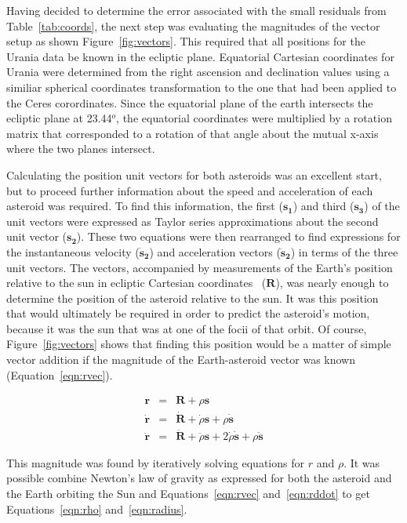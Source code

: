 \documentclass[a4paper,12pt]{article}
\begin{document}
Having decided to determine the error associated with the small residuals from Table~\ref{tab:coords}, the next step was evaluating the magnitudes of the vector setup as shown Figure~\ref{fig:vectors}. This required that all positions for the Urania data be known in the ecliptic plane. Equatorial Cartesian coordinates for Urania were determined from the right ascension and declination values using a similiar spherical coordinates transformation to the one that had been applied to the Ceres corordinates. Since the equatorial plane of the earth intersects the ecliptic plane at 23.44$^o$, the equatorial coordinates were multiplied by a rotation matrix that corresponded to a rotation of that angle about the mutual x-axis where the two planes intersect.

Calculating the position unit vectors for both asteroids was an excellent start, but to proceed further information about the speed and acceleration of each asteroid was required. To find this information, the first ($\mathbf{s_1}$) and third ($\mathbf{s_3}$) of the unit vectors were expressed as Taylor series approximations about the second unit vector ($\mathbf{s_2}$). These two equations were then rearranged to find expressions for the instantaneous velocity ($\mathbf{\dot{s}_2}$) and acceleration vectors ($\mathbf{\ddot{s}_2}$) in terms of the three unit vectors. The vectors, accompanied by measurements of the Earth's position relative to the sun in ecliptic Cartesian coordinates~\citep{urania} ($\mathbf{R}$), was nearly enough to determine the position of the asteroid relative to the sun. It was this position that would ultimately be required in order to predict the asteroid's motion, because it was the sun that was at one of the focii of that orbit. Of course, Figure~\ref{fig:vectors} shows that finding this position would be a matter of simple vector addition if the magnitude of the Earth-asteroid vector was known (Equation~\ref{eqn:rvec}).

\begin{eqnarray}
\label{eqn:rvec}
\mathbf{r} &=& \mathbf{R} + \rho\mathbf{s}\\
\label{eqn:rdot}
\mathbf{\dot{r}} &=& \mathbf{\dot{R}} + \dot{\rho}\mathbf{s} + \rho\mathbf{\dot{s}}\\
\label{eqn:rddot}
\mathbf{\ddot{r}} &=& \mathbf{\ddot{R}} + \ddot{\rho}\mathbf{s} + 2\dot{\rho}\mathbf{\dot{s}} + \rho\mathbf{\ddot{s}}
\end{eqnarray}

This magnitude was found by iteratively solving equations for $r$ and $\rho$. It was possible combine Newton's law of gravity as expressed for both the asteroid and the Earth orbiting the Sun and Equations~\ref{eqn:rvec} and~\ref{eqn:rddot} to get Equations~\ref{eqn:rho} and~\ref{eqn:radius}. 
\end{document}
